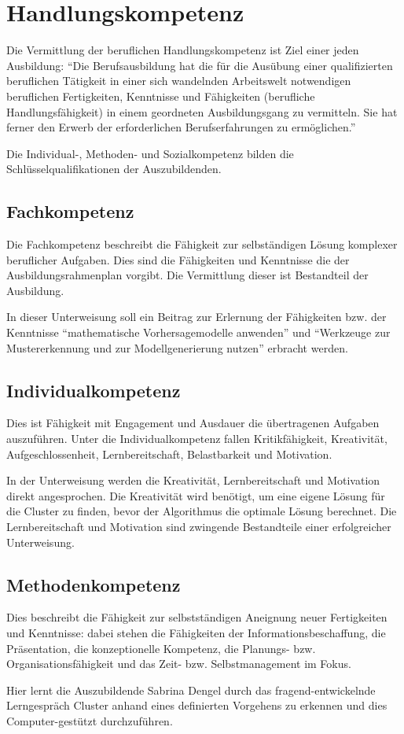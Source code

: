 \chapter{Handlungskompetenz}
Die Vermittlung der beruflichen Handlungskompetenz ist Ziel einer jeden Ausbildung: \enquote{Die Berufsausbildung hat die für die Ausübung einer qualifizierten beruflichen Tätigkeit in einer sich wandelnden Arbeitswelt notwendigen beruflichen Fertigkeiten, Kenntnisse und Fähigkeiten (berufliche Handlungsfähigkeit) in einem geordneten Ausbildungsgang zu vermitteln. Sie hat ferner den Erwerb der erforderlichen Berufserfahrungen zu ermöglichen.}\autocite[][§1\,III BBiG]{berufsbildungsgesetz_bbig_bbig_nodate} 
\par
Die Individual-, Methoden- und Sozialkompetenz bilden die Schlüsselqualifikationen der Auszubildenden. 

\section{Fachkompetenz}
Die Fachkompetenz beschreibt die Fähigkeit zur selbständigen Lösung komplexer beruflicher Aufgaben. Dies sind die Fähigkeiten und Kenntnisse die der Ausbildungsrahmenplan vorgibt. Die Vermittlung dieser ist Bestandteil der Ausbildung. 
\par
In dieser Unterweisung soll ein Beitrag zur Erlernung der Fähigkeiten bzw. der Kenntnisse \enquote{mathematische Vorhersagemodelle anwenden} und \enquote{Werkzeuge zur Mustererkennung und zur Modellgenerierung nutzen} erbracht werden.

\section{Individualkompetenz}
Dies ist Fähigkeit mit Engagement und Ausdauer die übertragenen Aufgaben auszuführen. Unter die Individualkompetenz fallen Kritikfähigkeit, Kreativität, Aufgeschlossenheit,  Lernbereitschaft, Belastbarkeit und Motivation.
\par
In der Unterweisung werden die Kreativität, Lernbereitschaft und Motivation direkt angesprochen. Die Kreativität wird benötigt, um eine eigene Lösung für die Cluster zu finden, bevor der Algorithmus die optimale Lösung berechnet. Die Lernbereitschaft und Motivation sind zwingende Bestandteile einer erfolgreicher Unterweisung. 

\section{Methodenkompetenz}
Dies beschreibt die Fähigkeit zur selbstständigen Aneignung neuer Fertigkeiten und Kenntnisse: dabei stehen die Fähigkeiten der Informationsbeschaffung, die Präsentation, die konzeptionelle Kompetenz, die Planungs- bzw. Organisationsfähigkeit und das Zeit- bzw. Selbstmanagement im Fokus.
\par
Hier lernt die Auszubildende Sabrina Dengel durch das fragend-entwickelnde Lerngespräch Cluster anhand eines definierten Vorgehens zu erkennen und dies Computer-gestützt durchzuführen.

